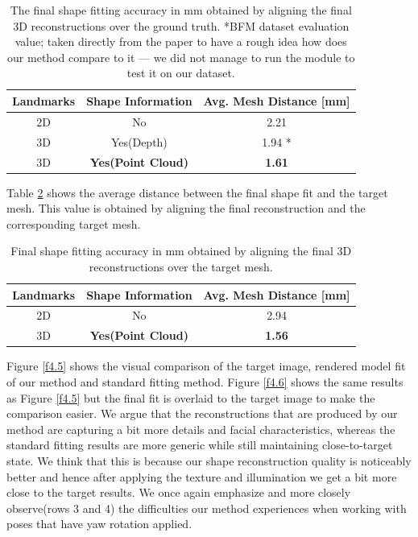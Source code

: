 \begin{table}[h]
  \centering
  \begin{tabular}{ c|c|c }
      Landmarks  & Shape Information & Avg. Mesh Distance [mm]\\
      \hline
      2D   & No  & 2.21 \cite{Schoenborn2017}\\
      3D   & Yes(Depth) & 1.94 \cite{betschard2016}*\\
      3D   & \textbf{Yes(Point Cloud)} & \textbf{1.61} \\
      \hline
  \end{tabular}
  \caption{The final shape fitting accuracy in mm obtained by aligning the final 3D reconstructions over the ground truth. *BFM dataset evaluation value; taken directly from the paper to have a rough idea how does our method compare to it — we did not manage to run the module to test it on our dataset.}
  \label{t4.2}
\end{table}

Table \ref{t4.3} shows the average distance between the final shape fit and the target mesh. This value is obtained by aligning the final reconstruction and the corresponding target mesh. \bigskip

\begin{table}[h]
  \centering
  \begin{tabular}{ c|c|c }
      Landmarks  & Shape Information & Avg. Mesh Distance [mm]\\
      \hline
      2D   & No  & 2.94 \cite{Schoenborn2017}\\
      3D   & \textbf{Yes(Point Cloud)} & \textbf{1.56} \\
      \hline
  \end{tabular}
  \caption{Final shape fitting accuracy in mm obtained by aligning the final 3D reconstructions over the target mesh.}
  \label{t4.3}
\end{table}

Figure \ref{f4.5} shows the visual comparison of the target image, rendered model fit of our method and standard fitting method. Figure \ref{f4.6} shows the same results as Figure \ref{f4.5} but the final fit is overlaid to the target image to make the comparison easier. We argue that the reconstructions that are produced by our method are capturing a bit more details and facial characteristics, whereas the standard fitting results are more generic while still maintaining close-to-target state. We think that this is because our shape reconstruction quality is noticeably better and hence after applying the texture and illumination we get a bit more close to the target results. We once again emphasize and more closely observe(rows 3 and 4) the difficulties our method experiences when working with poses that have yaw rotation applied.\bigskip

